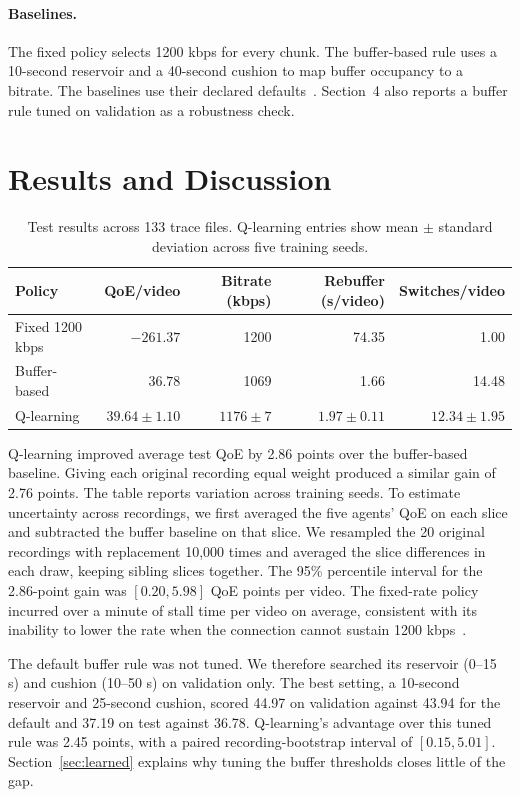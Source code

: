 \documentclass[10pt,letterpaper]{article}
\newif\ifreview
\newcommand{\reviewcolor}{\ifreview\color{reviewred}\fi}
\newcommand{\reviewtext}[1]{{\reviewcolor #1}}
\begin{document}
\paragraph{Baselines.}
The fixed policy selects 1200 kbps for every chunk. The buffer-based rule
uses a 10-second reservoir and a 40-second cushion to map buffer occupancy
to a bitrate. The baselines use their declared defaults~\cite{implementation}. Section~4
also reports a buffer rule tuned on validation as a robustness check.

\section{Results and Discussion}

\begin{table}[htbp]
\centering
\small
\caption{Test results across 133 trace files. Q-learning entries show mean
\(\pm\) standard deviation across five training seeds.}
\label{tab:test}
\begin{tabular}{lrrrr}
\toprule
Policy & QoE/video & Bitrate (kbps) & Rebuffer (s/video) & Switches/video \\
\midrule
Fixed 1200 kbps & \(-261.37\) & 1200 & 74.35 & 1.00 \\
Buffer-based & \(36.78\) & 1069 & 1.66 & 14.48 \\
Q-learning & \(39.64\pm1.10\) & \(1176\pm7\) & \(1.97\pm0.11\) & \(12.34\pm1.95\) \\
\bottomrule
\end{tabular}
\end{table}

Q-learning improved average test QoE by 2.86 points over the buffer-based
baseline. \reviewtext{Giving each original recording equal weight produced a similar
gain of 2.76 points.} The table reports variation across training seeds.
\reviewtext{To estimate uncertainty across recordings, we first averaged
the five agents' QoE on each slice and subtracted the buffer baseline on that
slice. We resampled the 20 original recordings with replacement 10,000 times
and averaged the slice differences in each draw, keeping sibling slices
together. The 95\% percentile interval for the 2.86-point gain was
\([0.20, 5.98]\) QoE points per video.} The fixed-rate policy incurred over a minute of
stall time per video on average, consistent with its inability to lower the
rate when the connection cannot sustain 1200 kbps~\cite{testresults}.

The default buffer rule was not tuned. We therefore searched its reservoir
(0--15 s) and cushion (10--50 s) on validation only. The best setting, a
10-second reservoir and 25-second cushion, scored 44.97 on validation against
43.94 for the default and 37.19 on test against 36.78. Q-learning's advantage
over this tuned rule was 2.45 points, with a paired recording-bootstrap
interval of \([0.15, 5.01]\). Section~\ref{sec:learned} explains why tuning
the buffer thresholds closes little of the gap.
\end{document}
